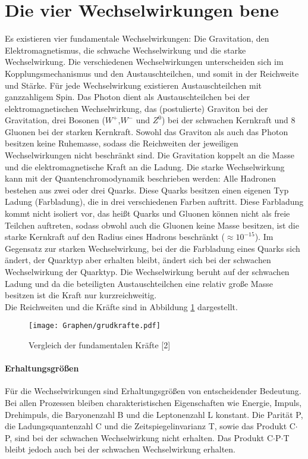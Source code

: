 \documentclass[twoside,colorback,accentcolor=tud4c,11pt]{tudreport}
\begin{document}
\section{Die vier Wechselwirkungen bene}
Es existieren vier fundamentale Wechselwirkungen: Die Gravitation, den Elektromagnetismus, die schwache Wechselwirkung und die starke Wechselwirkung. 
Die verschiedenen Wechselwirkungen unterscheiden sich im Kopplungsmechanismus und den Austauschteilchen, und somit in der Reichweite und Stärke. Für jede Wechselwirkung existieren Austauschteilchen mit ganzzahligem Spin. Das Photon dient als Austauschteilchen bei der elektromagnetischen Wechselwirkung, das (postulierte) Graviton bei der Gravitation, drei Bosonen ($W^+$,$W^-$ und $Z^0$) bei der schwachen Kernkraft und 8 Gluonen bei der starken Kernkraft. Sowohl das Graviton als auch das Photon besitzen keine Ruhemasse, sodass die Reichweiten der jeweiligen Wechselwirkungen nicht beschränkt sind. Die Gravitation koppelt an die Masse und die elektromagnetische Kraft an die Ladung. Die starke Wechselwirkung kann mit der Quantenchromodynamik beschrieben werden: Alle Hadronen bestehen aus zwei oder drei Quarks. Diese Quarks besitzen einen eigenen Typ Ladung (Farbladung), die in drei verschiedenen Farben auftritt. Diese Farbladung kommt nicht isoliert vor, das heißt Quarks und Gluonen können nicht als freie Teilchen auftreten, sodass obwohl auch die Gluonen keine Masse besitzen, ist die starke Kernkraft auf den Radius eines Hadrons beschränkt ($\approx 10^{-15}$). Im Gegensatz zur starken Wechselwirkung, bei der die Farbladung
eines Quarks sich ändert, der Quarktyp aber erhalten
bleibt, ändert sich bei der schwachen Wechselwirkung der
Quarktyp. Die Wechselwirkung beruht auf der schwachen Ladung und da die beteiligten Austauschteilchen eine relativ große Masse besitzen ist die Kraft nur kurzreichweitig. \\ Die Reichweiten und die Kräfte sind in Abbildung \ref{V_2.2} dargestellt.
\begin{figure}[H]
\centering
   	\begin{minipage}[b]{0.6\textwidth}
   	\texttt{[image: Graphen/grudkrafte.pdf]}
   	\caption{Vergleich der fundamentalen Kräfte [2]}
  	\label{V_2.2}
   	\end{minipage}
\end{figure}


\paragraph{Erhaltungsgrößen}
Für die Wechselwirkungen sind Erhaltungsgrößen von entscheidender Bedeutung. Bei allen Prozessen bleiben charakteristischen Eigenschaften wie Energie, Impuls, Drehimpuls, die Baryonenzahl B und die Leptonenzahl
L konstant. Die Parität P, die Ladungsquantenzahl C und die Zeitspiegelinvarianz T, sowie das Produkt C$\cdot$P, sind bei der schwachen Wechselwirkung nicht erhalten. Das Produkt C$\cdot$P$\cdot$T bleibt jedoch auch bei der schwachen Wechselwirkung erhalten.
\end{document}
